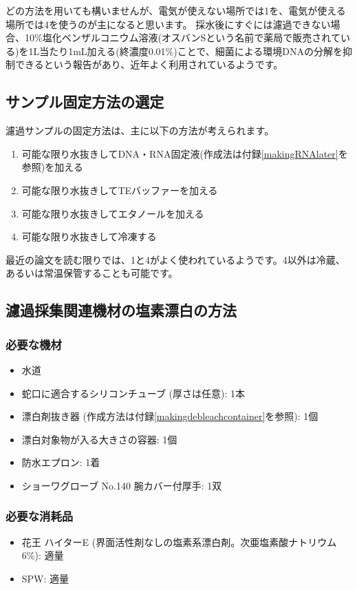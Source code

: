 \documentclass[titlepage,10pt,a4paper,uplatex]{jsbook}
\begin{document}
どの方法を用いても構いませんが、電気が使えない場所では1を、電気が使える場所では4を使うのが主になると思います。
採水後にすぐには濾過できない場合、10\%塩化ベンザルコニウム溶液(オスバンSという名前で薬局で販売されている)を1L当たり1mL加える(終濃度0.01\%)ことで、細菌による環境DNAの分解を抑制できるという報告\citep{Yamanaka2017}があり、近年よく利用されているようです。

\subsection{サンプル固定方法の選定}

濾過サンプルの固定方法は、主に以下の方法が考えられます。

\begin{enumerate}
\item 可能な限り水抜きしてDNA・RNA固定液(作成法は付録\ref{makingRNAlater}を参照)を加える
\item 可能な限り水抜きしてTEバッファーを加える
\item 可能な限り水抜きしてエタノールを加える
\item 可能な限り水抜きして冷凍する
\end{enumerate}

最近の論文を読む限りでは、1と4がよく使われているようです。4以外は冷蔵、あるいは常温保管することも可能です。

\subsection{濾過採集関連機材の塩素漂白の方法}

\subsubsection{必要な機材}
\begin{itemize}
\item 水道
\item 蛇口に適合するシリコンチューブ (厚さは任意): 1本
\item 漂白剤抜き器 (作成方法は付録\ref{makingdebleachcontainer}を参照): 1個
\item 漂白対象物が入る大きさの容器: 1個
\item 防水エプロン: 1着
\item ショーワグローブ No.140 腕カバー付厚手: 1双
\end{itemize}

\subsubsection{必要な消耗品}
\begin{itemize}
\item 花王 ハイターE (界面活性剤なしの塩素系漂白剤。次亜塩素酸ナトリウム6\%): 適量
\item SPW: 適量
\end{itemize}
\end{document}

